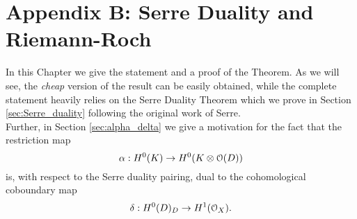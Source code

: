 
\chapter{Appendix B: Serre Duality and Riemann-Roch}\label{serre_duality} %



\ifpdf
    \graphicspath{{figures/}{figures/}{figures/}}
\else
    \graphicspath{{figures/}{figures/}}
\fi


In this Chapter we give the statement and a proof of the \RR Theorem. As we will see, the \emph{cheap} version of the result can be easily obtained, while the complete statement heavily relies on the Serre Duality Theorem which we prove in Section \ref{sec:Serre_duality} following the original work of Serre.\\ 
Further, in Section \ref{sec:alpha_delta} we give a motivation for the fact that the restriction map 
$$ \alpha:H^0(K)\to H^0(K\otimes \mathcal{O}(D)) $$ 
is, with respect to the Serre duality pairing, dual to the cohomological coboundary map 
$$\delta:H^0(D)_D\to H^1(\mathcal{O}_X).$$

